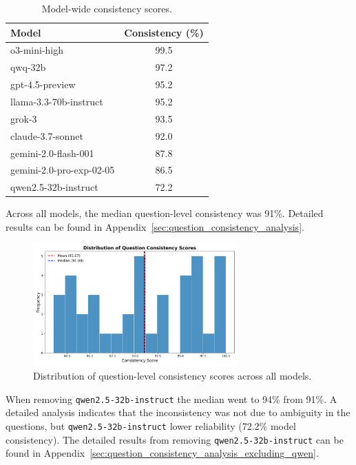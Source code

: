 \begin{table}[htbp]
    \centering
    \caption{Model-wide consistency scores.}
    \label{tab:model_consistency}
    \begin{tabular}{l c}
        \hline
        Model & Consistency (\%) \\
        \hline
        o3-mini-high & 99.5 \\
        qwq-32b & 97.2 \\
        gpt-4.5-preview & 95.2 \\
        llama-3.3-70b-instruct & 95.2 \\
        grok-3 & 93.5 \\
        claude-3.7-sonnet & 92.0 \\
        gemini-2.0-flash-001 & 87.8 \\
        gemini-2.0-pro-exp-02-05 & 86.5 \\
        qwen2.5-32b-instruct & 72.2 \\
        \hline
    \end{tabular}
\end{table}

Across all models, the median question-level consistency was 91\%. Detailed results can be found in Appendix~\ref{sec:question_consistency_analysis}.

\begin{figure}[htbp]
    \centering
    \includegraphics[width=0.7\textwidth]{figures/histogram_question_consistency.png}
    \caption{Distribution of question-level consistency scores across all models.}
    \label{fig:question_consistency}
\end{figure}

When removing \texttt{qwen2.5-32b-instruct} the median went to 94\% from 91\%. A detailed analysis indicates that the inconsistency was not due to ambiguity in the questions, but \texttt{qwen2.5-32b-instruct} lower reliability (72.2\% model consistency). The detailed results from removing \texttt{qwen2.5-32b-instruct} can be found in Appendix~\ref{sec:question_consistency_analysis_excluding_qwen}.

